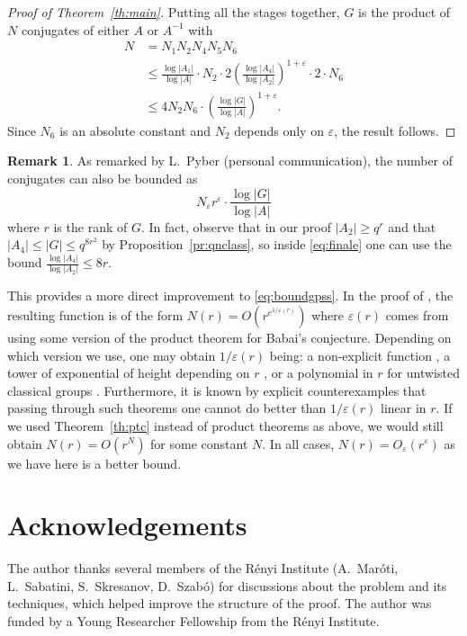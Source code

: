 \documentclass[a4paper]{article}
\theoremstyle{definition}
\newtheorem{remark}[proposition]{Remark}
\numberwithin{equation}{section}
\begin{document}
\begin{proof}[Proof of Theorem~\ref{th:main}]
Putting all the stages together, $G$ is the product of $N$ conjugates of either $A$ or $A^{-1}$ with
\begin{align}
N & =N_{1}N_{2}N_{4}N_{5}N_{6} \nonumber \\
& \leq\frac{\log|A_{1}|}{\log|A|}\cdot N_{2}\cdot 2\left(\frac{\log|A_{4}|}{\log|A_{2}|}\right)^{1+\varepsilon}\cdot 2\cdot N_{6} \label{eq:finale} \\
& \leq 4N_{2}N_{6}\cdot\left(\frac{\log|G|}{\log|A|}\right)^{1+\varepsilon}. \nonumber
\end{align}
Since $N_{6}$ is an absolute constant and $N_{2}$ depends only on $\varepsilon$, the result follows.
\end{proof}

\begin{remark}\label{re:pyber}
As remarked by L.~Pyber (personal communication), the number of conjugates can also be bounded as
\begin{equation*}
N_{\varepsilon}r^{\varepsilon}\cdot\frac{\log|G|}{\log|A|}
\end{equation*}
where $r$ is the rank of $G$. In fact, observe that in our proof $|A_{2}|\geq q^{r}$ and that $|A_{4}|\leq|G|\leq q^{8r^{2}}$ by Proposition~\ref{pr:qnclass}, so inside \eqref{eq:finale} one can use the bound $\frac{\log|A_{4}|}{\log|A_{2}|}\leq 8r$.

This provides a more direct improvement to \eqref{eq:boundgpss}. In the proof of \cite[Thm.~1.3]{GPSS13}, the resulting function is of the form $N(r)=O(r^{e^{1/\varepsilon(r)}})$ where $\varepsilon(r)$ comes from using some version of the product theorem for Babai's conjecture. Depending on which version we use, one may obtain $1/\varepsilon(r)$ being: a non-explicit function \cite{BGT11}, a tower of exponential of height depending on $r$ \cite{PS16}, or a polynomial in $r$ for untwisted classical groups \cite{BDH21}. Furthermore, it is known by explicit counterexamples \cite[Ex.~77]{PS16} that passing through such theorems one cannot do better than $1/\varepsilon(r)$ linear in $r$. If we used Theorem~\ref{th:ptc} instead of product theorems as above, we would still obtain $N(r)=O(r^{N})$ for some constant $N$. In all cases, $N(r)=O_{\varepsilon}(r^{\varepsilon})$ as we have here is a better bound.
\end{remark}

\section*{Acknowledgements}

The author thanks several members of the R\'enyi Institute (A.~Mar\'oti, L.~Sabatini, S.~Skresanov, D.~Szab\'o) for discussions about the problem and its techniques, which helped improve the structure of the proof. The author was funded by a Young Researcher Fellowship from the R\'enyi Institute.



\end{document}
